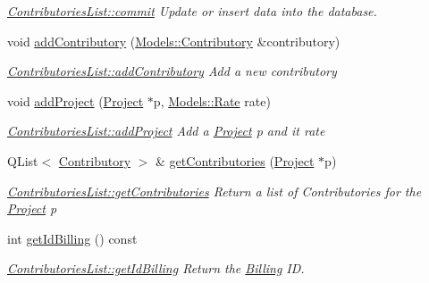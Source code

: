 \begin{DoxyCompactItemize}
\begin{DoxyCompactList}\small\item\em \hyperlink{classModels_1_1ContributoriesList_ad341e0527f4c9057281400f6cf54e54f}{Contributories\-List\-::commit} Update or insert data into the database. \end{DoxyCompactList}\item 
void \hyperlink{classModels_1_1ContributoriesList_a62b01d5292326da5902589ddb9b71234}{add\-Contributory} (\hyperlink{classModels_1_1Contributory}{Models\-::\-Contributory} \&contributory)
\begin{DoxyCompactList}\small\item\em \hyperlink{classModels_1_1ContributoriesList_a62b01d5292326da5902589ddb9b71234}{Contributories\-List\-::add\-Contributory} Add a new {\itshape contributory} \end{DoxyCompactList}\item 
void \hyperlink{classModels_1_1ContributoriesList_a4c99c890fc7d7616678d6e5f7ee558f5}{add\-Project} (\hyperlink{classModels_1_1Project}{Project} $\ast$p, \hyperlink{classModels_1_1Rate}{Models\-::\-Rate} rate)
\begin{DoxyCompactList}\small\item\em \hyperlink{classModels_1_1ContributoriesList_a4c99c890fc7d7616678d6e5f7ee558f5}{Contributories\-List\-::add\-Project} Add a \hyperlink{classModels_1_1Project}{Project} {\itshape p} and it {\itshape rate} \end{DoxyCompactList}\item 
Q\-List$<$ \hyperlink{classModels_1_1Contributory}{Contributory} $>$ \& \hyperlink{classModels_1_1ContributoriesList_a2549547fd3866d879ebbfd1f38145fc5}{get\-Contributories} (\hyperlink{classModels_1_1Project}{Project} $\ast$p)
\begin{DoxyCompactList}\small\item\em \hyperlink{classModels_1_1ContributoriesList_a2549547fd3866d879ebbfd1f38145fc5}{Contributories\-List\-::get\-Contributories} Return a list of Contributories for the \hyperlink{classModels_1_1Project}{Project} {\itshape p} \end{DoxyCompactList}\item 
int \hyperlink{classModels_1_1ContributoriesList_a3fbbce49ffcdbfa0693f4d21dd0d8c14}{get\-Id\-Billing} () const 
\begin{DoxyCompactList}\small\item\em \hyperlink{classModels_1_1ContributoriesList_a3fbbce49ffcdbfa0693f4d21dd0d8c14}{Contributories\-List\-::get\-Id\-Billing} Return the \hyperlink{classModels_1_1Billing}{Billing} I\-D. \end{DoxyCompactList}\item 

\end{DoxyCompactItemize}

